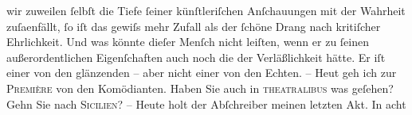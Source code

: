 \begin{ledgroupsized}[t]{13cm}
               wir zuweilen ſelbſt die Tiefe ſeiner künſtleriſchen Anſchauungen mit der Wahrheit
                  zuſa{\geminationm}enfällt, ſo iſt das gewiſs mehr Zufall als der
               ſchöne Drang nach kritiſcher Ehrlichkeit. Und was könnte dieſer Menſch nicht {\pb}leiſten, wenn er zu ſeinen außerordentlichen
               Eigenſchaften auch noch die der Verläßlichkeit hätte. Er iſt einer von den glänzenden
               – aber nicht einer von den Echten. –\pend
           \pstart
           Heut geh ich zur \textsc{Première} von den Komödianten. Haben Sie auch in \textsc{theatralibus} was {\pb}geſehen? Gehn Sie nach \textsc{Sicilien}? –\pend
           \pstart
           Heute holt der Abſchreiber
               meinen letzten Akt. In acht

\end{ledgroupsized}
